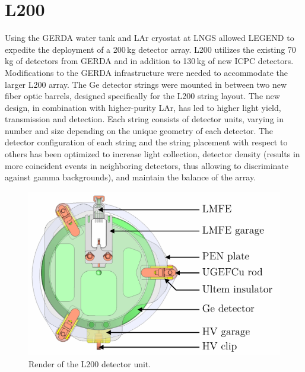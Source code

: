 \section{L200}

Using the GERDA water tank and LAr cryostat at LNGS allowed LEGEND to expedite the deployment of a 200\,kg \geEn{} detector array. L200 utilizes the existing 70\,kg of detectors from GERDA and {\MJMit} in addition to 130\,kg of new ICPC detectors. Modifications to the GERDA infrastructure were needed to accommodate the larger L200 array. The Ge detector strings were mounted in between two new fiber optic barrels, designed specifically for the L200 string layout. The new design, in combination with higher-purity LAr, has led to higher light yield, transmission and detection. Each string consists of detector units, varying in number and size depending on the unique geometry of each detector. The detector configuration of each string and the string placement with respect to others has been optimized to increase light collection, detector density (results in more coincident events in neighboring detectors, thus allowing to discriminate against gamma backgrounds), and maintain the balance of the array. 
\begin{figure}[htb]
	\centering
	\includegraphics{figs/legend/detector_unit_width_4in.pdf}
	\caption{Render of the L200 detector unit.}
	\label{fig:legend_detector_unit}
\end{figure}

